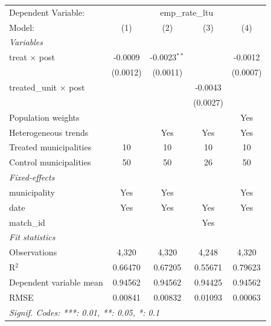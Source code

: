 
\begingroup
\centering
\begin{tabular}{lcccc}
   \tabularnewline \midrule \midrule
   Dependent Variable: & \multicolumn{4}{c}{emp\_rate\_ltu}\\
   Model:                        & (1)      & (2)            & (3)      & (4)\\  
   \midrule
   \emph{Variables}\\
   treat $\times$ post           & -0.0009  & -0.0023$^{**}$ &          & -0.0012\\   
                                 & (0.0012) & (0.0011)       &          & (0.0007)\\   
   treated\_unit $\times$ post   &          &                & -0.0043  &   \\   
                                 &          &                & (0.0027) &   \\   
   Population weights            &          &                &          & Yes\\  
   Heterogeneous trends          &          & Yes            & Yes      & Yes\\  
   Treated municipalities        & 10       & 10             & 10       & 10\\  
   Control municipalities        & 50       & 50             & 26       & 50\\  
   \midrule
   \emph{Fixed-effects}\\
   municipality                  & Yes      & Yes            &          & Yes\\  
   date                          & Yes      & Yes            & Yes      & Yes\\  
   match\_id                     &          &                & Yes      & \\  
   \midrule
   \emph{Fit statistics}\\
   Observations                  & 4,320    & 4,320          & 4,248    & 4,320\\  
   R$^2$                         & 0.66470  & 0.67205        & 0.55671  & 0.79623\\  
   Dependent variable mean       & 0.94562  & 0.94562        & 0.94425  & 0.94562\\  
   RMSE                          & 0.00841  & 0.00832        & 0.01093  & 0.00063\\  
   \midrule \midrule
   \multicolumn{5}{l}{\emph{Signif. Codes: ***: 0.01, **: 0.05, *: 0.1}}\\
\end{tabular}
\par\endgroup


